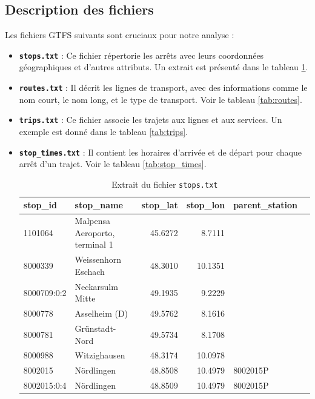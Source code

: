 \subsection{Description des fichiers}

Les fichiers GTFS suivants sont cruciaux pour notre analyse :

\begin{itemize}
    \item \textbf{\texttt{stops.txt}} : Ce fichier répertorie les arrêts avec leurs coordonnées géographiques et d’autres attributs. 
    Un extrait est présenté dans le tableau \ref{tab:stops}.
    \item \textbf{\texttt{routes.txt}} : Il décrit les lignes de transport, avec des informations comme le nom court, le nom long, et le type de transport. 
    Voir le tableau \ref{tab:routes}.
    \item \textbf{\texttt{trips.txt}} : Ce fichier associe les trajets aux lignes et aux services.
    Un exemple est donné dans le tableau \ref{tab:trips}.
    \item \textbf{\texttt{stop\_times.txt}} : Il contient les horaires d’arrivée et de départ pour chaque arrêt d’un trajet.
    Voir le tableau \ref{tab:stop_times}.
    \begin{table}[h]
    \caption{Extrait du fichier \texttt{stops.txt}}
    \label{tab:stops}
    \centering
    \begin{tabular}{l l r r l l}
    \toprule
    stop\_id & stop\_name & stop\_lat & stop\_lon  & parent\_station \\
    \midrule
    1101064 & Malpensa Aeroporto, terminal 1 & 45.6272 & 8.7111 & \\
    8000339 & Weissenhorn Eschach & 48.3010 & 10.1351  & \\
    8000709:0:2 & Neckarsulm Mitte & 49.1935 & 9.2229  & \\
    8000778 & Asselheim (D) & 49.5762 & 8.1616  & \\
    8000781 & Grünstadt-Nord & 49.5734 & 8.1708 & \\
    8000988 & Witzighausen & 48.3174 & 10.0978 & \\
    8002015 & Nördlingen & 48.8508 & 10.4979 & 8002015P \\
    8002015:0:4 & Nördlingen & 48.8509 & 10.4979 & 8002015P \\
    \bottomrule
    \end{tabular}
    \end{table}


\end{itemize}
